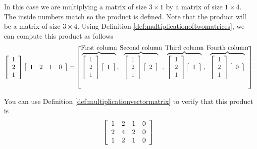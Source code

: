 \begin{solution} In this case we are multiplying a matrix of size $3 \times 1$ by a matrix of size $1 \times
4.$ The inside numbers match so the product is defined. Note that the product will be a matrix of size $3 \times 4$. 
Using Definition \ref{def:multiplicationoftwomatrices}, we can compute this product as follows $\:$
\begin{equation*}
\left[
\begin{array}{r}
1 \\
2 \\
1
\end{array}
\right] \left[
\begin{array}{rrrr}
1 & 2 & 1 & 0
\end{array}
\right] = 
\left[ \overset{
\mbox{First column}}{\overbrace{\left[
\begin{array}{r}
1 \\
2 \\
1
\end{array}
\right] \left[
\begin{array}{r}
1
\end{array}
\right] }},\overset{\mbox{Second column}}{\overbrace{\left[
\begin{array}{r}
1 \\
2\\
1
\end{array}
\right] \left[
\begin{array}{r}
2 
\end{array}
\right] }},\overset{\mbox{Third column}}{\overbrace{\left[
\begin{array}{r}
1 \\
2 \\
1
\end{array}
\right] \left[
\begin{array}{r}
1
\end{array}
\right] }}, \overset {\mbox{Fourth column}}{\overbrace{\left[
\begin{array}{r}
1\\
2\\
1
\end{array}
\right] \left[
\begin{array}{r}
0
\end{array}
\right]}}
\right]
\end{equation*}

You can use Definition \ref{def:multiplicationvectormatrix} to verify that this product is
\begin{equation*}
\left[
\begin{array}{cccc}
1 & 2 & 1 & 0 \\
2 & 4 & 2 & 0 \\
1 & 2 & 1 & 0
\end{array}
\right]
\end{equation*}
\end{solution}

